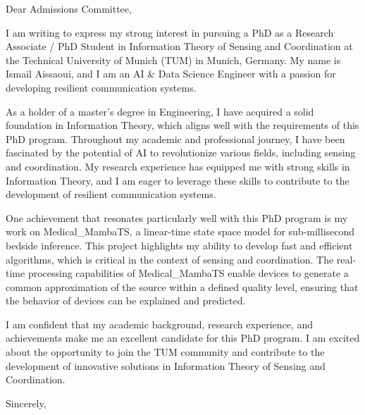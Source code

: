 \documentclass[11pt]{letter}
\begin{document}
\opening{\vspace*{\baselineskip}\noindent Dear Admissions Committee,}

I am writing to express my strong interest in pursuing a PhD as a Research Associate / PhD Student in Information Theory of Sensing and Coordination at the Technical University of Munich (TUM) in Munich, Germany. My name is Ismail Aissaoui, and I am an AI & Data Science Engineer with a passion for developing resilient communication systems.

As a holder of a master's degree in Engineering, I have acquired a solid foundation in Information Theory, which aligns well with the requirements of this PhD program. Throughout my academic and professional journey, I have been fascinated by the potential of AI to revolutionize various fields, including sensing and coordination. My research experience has equipped me with strong skills in Information Theory, and I am eager to leverage these skills to contribute to the development of resilient communication systems.

One achievement that resonates particularly well with this PhD program is my work on Medical_MambaTS, a linear-time state space model for sub-millisecond bedside inference. This project highlights my ability to develop fast and efficient algorithms, which is critical in the context of sensing and coordination. The real-time processing capabilities of Medical_MambaTS enable devices to generate a common approximation of the source within a defined quality level, ensuring that the behavior of devices can be explained and predicted.

I am confident that my academic background, research experience, and achievements make me an excellent candidate for this PhD program. I am excited about the opportunity to join the TUM community and contribute to the development of innovative solutions in Information Theory of Sensing and Coordination.

\closing{\vspace*{\baselineskip}\noindent Sincerely,}
\end{document}

